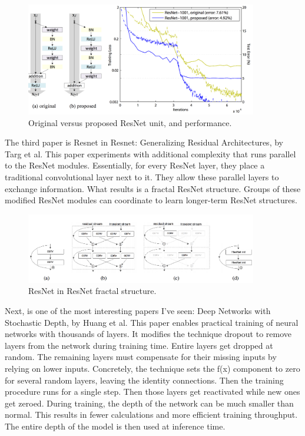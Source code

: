 \documentclass[12pt]{article}
\numberwithin{equation}{section}
\numberwithin{table}{section}
\numberwithin{figure}{section}
\begin{document}
\begin{figure} \centering
	\includegraphics[width=0.9\textwidth]{image1.png}
	\caption{Original versus proposed ResNet unit, and performance.}
	\label{figsolplot}
\end{figure}

The third paper is Resnet in Resnet: Generalizing Residual Architectures, by Targ et al. This paper experiments with additional complexity that runs parallel to the ResNet modules. Essentially, for every ResNet layer, they place a traditional convolutional layer next to it. They allow these parallel layers to exchange information. What results is a fractal ResNet structure. Groups of these modified ResNet modules can coordinate to learn longer-term ResNet structures.


\begin{figure} \centering
	\includegraphics[width=0.9\textwidth]{image2.png}
	\caption{ResNet in ResNet fractal structure.}
	\label{figure2}
\end{figure}


Next, is one of the most interesting papers I’ve seen: Deep Networks with Stochastic Depth, by Huang et al. This paper enables practical training of neural networks with thousands of layers. It modifies the technique dropout to remove layers from the network during training time. Entire layers get dropped at random. The remaining layers must compensate for their missing inputs by relying on lower inputs. Concretely, the technique sets the f(x) component to zero for several random layers, leaving the identity connections. Then the training procedure runs for a single step. Then those layers get reactivated while new ones get zeroed. During training, the depth of the network can be much smaller than normal. This results in fewer calculations and more efficient training throughput. The entire depth of the model is then used at inference time.
\end{document}
